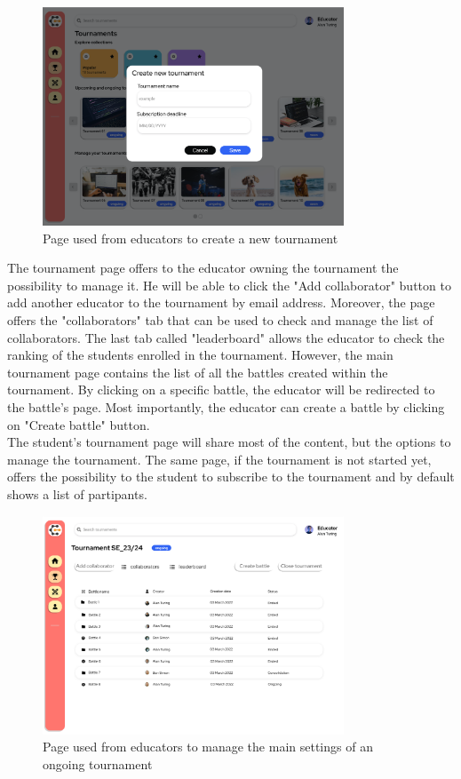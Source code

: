 \begin{figure}[H]
    \centering
    \includegraphics[width=0.8\textwidth]{Mockups/6_educator_create_tournament.png}
    \caption{Page used from educators to create a new tournament}
\end{figure}
The tournament page offers to the educator owning the tournament the possibility to manage it. He will be able to click the "Add collaborator" button to add another educator to the tournament by email address. Moreover, the page offers the "collaborators" tab that can be used to check and manage the list of collaborators. The last tab called "leaderboard" allows the educator to check the ranking of the students enrolled in the tournament. However, the main tournament page contains the list of all the battles created within the tournament.  By clicking on a specific battle, the educator will be redirected to the battle's page. Most importantly, the educator can create a battle by clicking on "Create battle" button.\\
The student's tournament page will share most of the content, but the options to manage the tournament. The same page, if the tournament is not started yet, offers the possibility to the student to subscribe to the tournament and by default shows a list of partipants. \\
\begin{figure}[H]
    \centering
    \includegraphics[width=0.8\textwidth]{Mockups/7_educator_manages_tournament.png}
    \caption{Page used from educators to manage the main settings of an ongoing tournament}
\end{figure}
